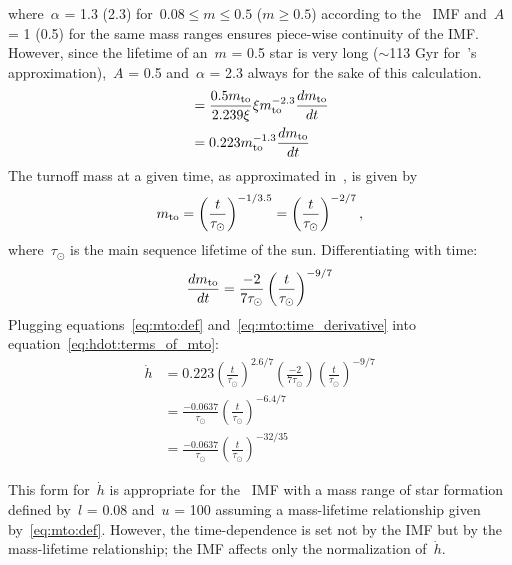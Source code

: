 \documentclass[\main/notes.tex]{subfiles}
\begin{document}
where~$\alpha$ = 1.3 (2.3) for~$0.08 \leq m \leq 0.5$ ($m \geq 0.5$) according 
to the~\citet{Kroupa2001} IMF and~$A$ = 1 (0.5) for the same mass ranges 
ensures piece-wise continuity of the IMF. 
However, since the lifetime of an~$m$ = 0.5 star is very long ($\sim$113 Gyr 
for~\vice's approximation),~$A$ = 0.5 and~$\alpha$ = 2.3 always for the sake of 
this calculation. 
\begin{subequations}\begin{align} 
&= \frac{0.5m_\text{to}}{2.239\xi} \xi m_\text{to}^{-2.3} \frac{dm_\text{to}}{dt} 
\\ 
&= 0.223m_\text{to}^{-1.3} \frac{dm_\text{to}}{dt} 
\label{eq:hdot:terms_of_mto} 
\end{align}\end{subequations} 
The turnoff mass at a given time, as approximated in~\vice, is given by 
\begin{equation} 
m_\text{to} = \left(\frac{t}{\tau_\odot}\right)^{-1/3.5} = 
\left(\frac{t}{\tau_\odot}\right)^{-2/7}, 
\label{eq:mto:def} 
\end{equation} 
where~$\tau_\odot$ is the main sequence lifetime of the sun. 
Differentiating with time: 
\begin{equation} 
\frac{dm_\text{to}}{dt} = \frac{-2}{7\tau_\odot} 
\left(\frac{t}{\tau_\odot}\right)^{-9/7} 
\label{eq:mto:time_derivative} 
\end{equation} 
Plugging equations~\ref{eq:mto:def} and~\ref{eq:mto:time_derivative} into 
equation~\ref{eq:hdot:terms_of_mto}: 
\begin{subequations}\begin{align} 
\dot{h} &= 0.223\left(\frac{t}{\tau_\odot}\right)^{2.6/7} 
\left(\frac{-2}{7\tau_\odot}\right)\left(\frac{t}{\tau_\odot}\right)^{-9/7} 
\\ 
&= \frac{-0.0637}{\tau_\odot}\left(\frac{t}{\tau_\odot}\right)^{-6.4/7} 
\\ 
&= \frac{-0.0637}{\tau_\odot}\left(\frac{t}{\tau_\odot}\right)^{-32/35} 
\label{eq:hdot} 
\end{align}\end{subequations} 

This form for~$\dot{h}$ is appropriate for the~\citet{Kroupa2001} IMF with a 
mass range of star formation defined by~$l$ = 0.08 and~$u$ = 100 assuming a 
mass-lifetime relationship given by~\ref{eq:mto:def}. 
However, the time-dependence is set not by the IMF but by the mass-lifetime 
relationship; the IMF affects only the normalization of~$\dot{h}$. 
\end{document}
